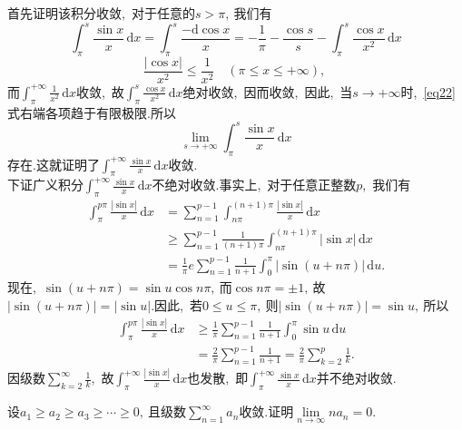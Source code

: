 	\begin{solution}
		首先证明该积分收敛,\ 对于任意的$s>\pi,\ $我们有
		\begin{equation}
			\int_{\pi}^{s}\frac{\sin x}{x}\,\text{d}x=\int_{\pi}^{s}\frac{-\text{d}\cos x}{x}=-\frac{1}{\pi}-\frac{\cos s}{s}-\int_{\pi}^{s}\frac{\cos x}{x^2}\,\text{d}x\label{eq22}
		\end{equation}
		$$\frac{\left|\cos x\right|}{x^2}\le \frac{1}{x^2}\quad\left(\pi\le x \le+\infty\right),\ $$
		而$\int_{\pi}^{+\infty}\frac{1}{x^2}\,\text{d}x$收敛,\ 故$\int_{\pi}^{s}\frac{\cos x}{x^2}\,\text{d}x$绝对收敛,\ 因而收敛,\ 因此,\ 当$s\rightarrow+\infty$时,\ \eqref{eq22}式右端各项趋于有限极限.所以
		$$\lim\limits_{s\rightarrow+\infty}\int_{\pi}^{s}\frac{\sin x}{x}\,\text{d}x$$
		存在.这就证明了$\int_{\pi}^{+\infty}\frac{\sin x}{x}\,\text{d}x$收敛.\\
		下证广义积分$\int_{\pi}^{+\infty}\frac{\sin x}{x}\,\text{d}x$不绝对收敛.事实上,\ 对于任意正整数$p$,\ 我们有
		\begin{align*}
			\int_{\pi}^{p\pi}\frac{\left|\sin x\right|}{x}\,\text{d}x&=\sum\limits_{n=1}^{p-1}\int_{n\pi}^{(n+1)\pi}\frac{\left|\sin x\right|}{x}\,\text{d}x\\
			&\ge\sum\limits_{n=1}^{p-1}\frac{1}{(n+1)\pi}\int_{n\pi}^{(n+1)\pi}\left|\sin x\right|\,\text{d}x\\
			&=\frac{1}{\pi}e\sum\limits_{n=1}^{p-1}\frac{1}{n+1}\int_{0}^{\pi}\left|\sin(u+n\pi)\right|\,\text{d}u.
		\end{align*}
		现在,\ $\sin(u+n\pi)=\sin u\cos n\pi,\ $而$\cos n\pi = \pm1,\ $故$\left|\sin(u+n\pi)\right|=\left|\sin u\right|.$因此,\ 若$0\le u\le \pi,\ $则$\left|\sin(u+n\pi)\right|=\sin u,\ $所以
		\begin{align*}
			\int_{\pi}^{p\pi}\frac{\left|\sin x\right|}{x}\,\text{d}x&\ge\frac{1}{\pi}\sum\limits_{n=1}^{p-1}\frac{1}{n+1}\int_{0}^{\pi}\sin u\,\text{d}u\\
			&=\frac{2}{\pi}\sum\limits_{n=1}^{p-1}\frac{1}{n+1}=\frac{2}{\pi}\sum\limits_{k=2}^{p}\frac{1}{k}.
		\end{align*}
		因级数$\sum\limits_{k=2}^{\infty}\frac{1}{k}$,\ 故$\int_{\pi}^{+\infty}\frac{\left|\sin x\right|}{x}\,\text{d}x$也发散,\ 即$\int_{\pi}^{+\infty}\frac{\sin x}{x}\,\text{d}x$并不绝对收敛. 
	\end{solution}
	\newpage
	\begin{problem}
		设$a_1\ge a_2\ge a_3\ge \cdots\ge 0,\ $且级数$\sum\limits_{n=1}^{\infty}a_n$收敛.证明$\lim\limits_{n\rightarrow\infty}na_n=0.$
	\end{problem}
	
